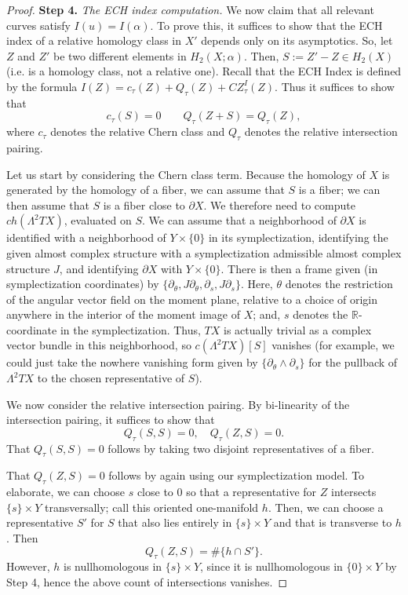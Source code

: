 \documentclass[11pt, reqno]{amsart}
\theoremstyle{remark}
\numberwithin{equation}{subsection}
\numberwithin{figure}{section}
\theoremstyle{customremark}
\newcommand{\NI}{{\noindent}}
\newcommand{\MS}{{\medskip}}
\begin{document}
\begin{proof}
\MS



\NI {\bf  Step 4.}  {\it The ECH index computation.}  We now claim that all relevant curves satisfy
 $I(u) = I(\alpha)$.  To prove this, it suffices to show that the ECH index of a relative homology class in $X'$ depends only on its asymptotics.  So, let $Z$ and $Z'$ be two different elements in $H_2(X;\alpha)$.  Then, $S := Z'- Z \in H_2(X)$ (i.e. is a homology class, not a relative one).  Recall that the ECH Index is defined by the formula $I(Z) = c_{\tau}(Z) + Q_{\tau}(Z) + CZ^I_{\tau}(Z).$  Thus it suffices to show that
\[ c_{\tau}(S) = 0 \quad \quad Q_{\tau}(Z + S) = Q_{\tau}(Z),\]
where $c_{\tau}$ denotes the relative Chern class and $Q_{\tau}$ denotes the relative intersection pairing.   

Let us start by considering the Chern class term.  Because the homology of $X$ is generated by the homology of a fiber, we can assume that $S$ is a fiber; we can then assume that $S$ is a fiber close to $\partial X$.  We therefore need to compute $ch(\Lambda^2 TX)$, evaluated on $S$.  We can assume that a neighborhood of $\partial X$ is identified with a neighborhood of $Y \times \lbrace 0 \rbrace$ in its symplectization, identifying the given almost complex structure with a symplectization admissible almost complex structure $J$, and identifying $\partial X$ with $Y \times \lbrace 0 \rbrace$.  There is then a frame given (in symplectization coordinates) by $\lbrace \partial_\theta, J \partial_\theta, \partial_s, J \partial_s \rbrace$.  Here, $\theta$ denotes the restriction of the angular vector field on the moment plane, relative to a choice of origin anywhere in the interior of the moment image of $X$; and, $s$ denotes the $\mathbb{R}$-coordinate in the symplectization.  Thus, $TX$ is actually trivial as a complex vector bundle in this neighborhood, so $c(\Lambda^2 TX)[S]$ vanishes (for example, we could just take the nowhere vanishing form given by $\lbrace \partial_\theta \wedge \partial_s \rbrace$ for the pullback of $\Lambda^2 TX$ to the chosen representative of $S$).

We now consider the relative intersection pairing.  By bi-linearity of the intersection pairing, it suffices to show that 
\[ Q_{\tau}(S,S) = 0, \quad Q_\tau(Z,S) = 0.\]  
That $Q_{\tau}(S,S) = 0 $ follows by taking two disjoint representatives of a fiber.   

That $Q_\tau(Z,S) = 0$ follows by again using our symplectization model.  To elaborate, we can choose $s$ close to $0$ so that a representative for $Z$ intersects $\lbrace s \rbrace \times Y$ transversally; call this oriented one-manifold $h$.  Then, we can choose a representative $S'$ for $S$ that also lies entirely in $\lbrace s \rbrace  \times  Y$ and that is transverse to $h$.  Then   
\[ Q_\tau(Z,S) = \# \lbrace h \cap S' \rbrace.\]
However, $h$ is nullhomologous in $\lbrace s \rbrace \times Y$, since it is nullhomologous in $\lbrace 0 \rbrace  \times Y$ by Step 4, hence the above count of intersections vanishes.
\MS


\end{proof}
\end{document}

